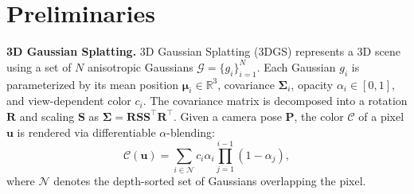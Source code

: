 \section{Preliminaries}
\label{sec:preliminary}


\noindent \textbf{3D Gaussian Splatting.}
3D Gaussian Splatting (3DGS) represents a 3D scene using a set of $N$ anisotropic Gaussians $\mathcal{G} = \{g_i\}_{i=1}^N$. 
Each Gaussian $g_i$ is parameterized by its mean position $\bm{\mu}_i \in \mathbb{R}^3$, covariance $\bm{\Sigma}_i$, opacity $\alpha_i \in [0, 1]$, and view-dependent color $c_i$. 
The covariance matrix is decomposed into a rotation $\bm{R}$ and scaling $\bm{S}$ as $\bm{\Sigma} = \bm{R}\bm{S}\bm{S}^\top\bm{R}^\top$.
Given a camera pose $\bm{P}$, the color $\mathcal{C}$ of a pixel $\bm{u}$ is rendered via differentiable $\alpha$-blending:
\begin{equation}
\mathcal{C}(\bm{u}) = \sum_{i \in \mathcal{N}} c_i \alpha_i \prod_{j=1}^{i-1} (1 - \alpha_j),
\end{equation}
where $\mathcal{N}$ denotes the depth-sorted set of Gaussians overlapping the pixel.


